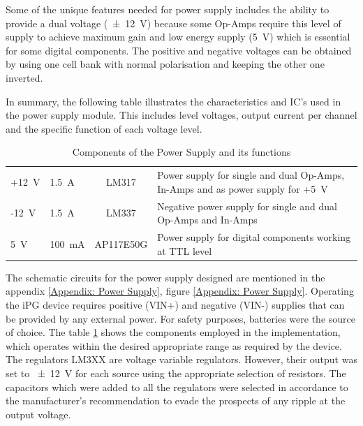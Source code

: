 Some of the unique features needed for power supply includes the ability to provide a dual voltage (\SI{\pm 12}{\volt}) because some Op-Amps require this level of supply to achieve maximum gain and low energy supply (\SI{5}{\volt}) which is essential for some digital components. The positive and negative voltages can be obtained by using one cell bank with normal polarisation and keeping the other one inverted. 

In summary, the following table illustrates the characteristics and IC's used in the power supply module. This includes level voltages, output current per channel and the specific function of each voltage level. 

\begin{table}[!htpb]
	\caption{Components of the Power Supply and its functions}
	\centering
	\label{table:power supply details}
	\begin{tabular}{p{2 cm} p{2 cm} c p{6 cm}}
		\toprule
		\centering{\textbf{Voltage supply}} & \centering{\textbf{Current supply}} & \centering{\textbf{IC}} & \centering{\textbf{Function}} \tabularnewline \midrule
		+\SI{12}{\volt} & \SI{1.5}{\ampere} & LM317 & Power supply for single and dual Op-Amps, In-Amps and as power supply for +\SI{5}{\volt} \tabularnewline \midrule 
		-\SI{12}{\volt} & \SI{1.5}{\ampere} & LM337 & Negative power supply for single and dual Op-Amps and In-Amps \tabularnewline \midrule 
		\SI{5}{\volt} & \SI{100}{\milli\ampere} & AP117E50G & Power supply for digital components working at TTL level \tabularnewline \bottomrule 
	\end{tabular}
\end{table}

The schematic circuits for the power supply designed are mentioned in the appendix \ref{Appendix: Power Supply}, figure \ref{Appendix: Power Supply}. Operating the iPG device requires positive (VIN+) and negative (VIN-) supplies that can be provided by any external power. For safety purposes, batteries were the source of choice. The table \ref{table:power supply details} shows the components employed in the implementation, which operates within the desired appropriate range as required by the device. The regulators LM3XX \cite{ti:LMx37} are voltage variable regulators. However, their output was set to \SI{\pm 12}{\volt} for each source using the appropriate selection of resistors. The capacitors which were added to all the regulators were selected in accordance to the manufacturer's recommendation to evade the prospects of any ripple at the output voltage.

